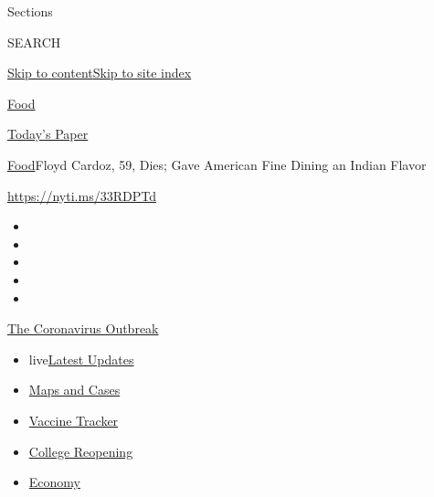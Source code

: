 Sections

SEARCH

\protect\hyperlink{site-content}{Skip to
content}\protect\hyperlink{site-index}{Skip to site index}

\href{https://www.nytimes.com/section/food}{Food}

\href{https://myaccount.nytimes.com/auth/login?response_type=cookie\&client_id=vi}{}

\href{https://www.nytimes.com/section/todayspaper}{Today's Paper}

\href{/section/food}{Food}\textbar{}Floyd Cardoz, 59, Dies; Gave
American Fine Dining an Indian Flavor

\url{https://nyti.ms/33RDPTd}

\begin{itemize}
\item
\item
\item
\item
\item
\end{itemize}

\href{https://www.nytimes.com/news-event/coronavirus?action=click\&pgtype=Article\&state=default\&region=TOP_BANNER\&context=storylines_menu}{The
Coronavirus Outbreak}

\begin{itemize}
\tightlist
\item
  live\href{https://www.nytimes.com/2020/08/03/world/coronavirus-covid-19.html?action=click\&pgtype=Article\&state=default\&region=TOP_BANNER\&context=storylines_menu}{Latest
  Updates}
\item
  \href{https://www.nytimes.com/interactive/2020/us/coronavirus-us-cases.html?action=click\&pgtype=Article\&state=default\&region=TOP_BANNER\&context=storylines_menu}{Maps
  and Cases}
\item
  \href{https://www.nytimes.com/interactive/2020/science/coronavirus-vaccine-tracker.html?action=click\&pgtype=Article\&state=default\&region=TOP_BANNER\&context=storylines_menu}{Vaccine
  Tracker}
\item
  \href{https://www.nytimes.com/2020/08/02/us/covid-college-reopening.html?action=click\&pgtype=Article\&state=default\&region=TOP_BANNER\&context=storylines_menu}{College
  Reopening}
\item
  \href{https://www.nytimes.com/live/2020/08/03/business/stock-market-today-coronavirus?action=click\&pgtype=Article\&state=default\&region=TOP_BANNER\&context=storylines_menu}{Economy}
\end{itemize}

